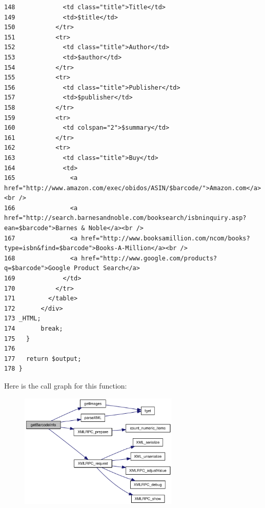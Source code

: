 \begin{Code}
\begin{verbatim}
148             <td class="title">Title</td>
149             <td>$title</td>
150           </tr>
151           <tr>
152             <td class="title">Author</td>
153             <td>$author</td>
154           </tr>
155           <tr>
156             <td class="title">Publisher</td>
157             <td>$publisher</td>
158           </tr>
159           <tr>
160             <td colspan="2">$summary</td>
161           </tr>
162           <tr>
163             <td class="title">Buy</td>
164             <td>
165               <a href="http://www.amazon.com/exec/obidos/ASIN/$barcode/">Amazon.com</a><br />
166               <a href="http://search.barnesandnoble.com/booksearch/isbninquiry.asp?ean=$barcode">Barnes & Noble</a><br />
167               <a href="http://www.booksamillion.com/ncom/books?type=isbn&find=$barcode">Books-A-Million</a><br />
168               <a href="http://www.google.com/products?q=$barcode">Google Product Search</a>
169             </td>
170           </tr>
171         </table>
172       </div>
173 _HTML;
174       break;
175   }
176 
177   return $output;
178 }\end{verbatim}
\end{Code}




Here is the call graph for this function:\nopagebreak
\begin{figure}[H]
\begin{center}
\leavevmode
\includegraphics[width=215pt]{barcode_8inc_e10c37e4f9f9b7c6617a388351a27c99_cgraph}
\end{center}
\end{figure}
